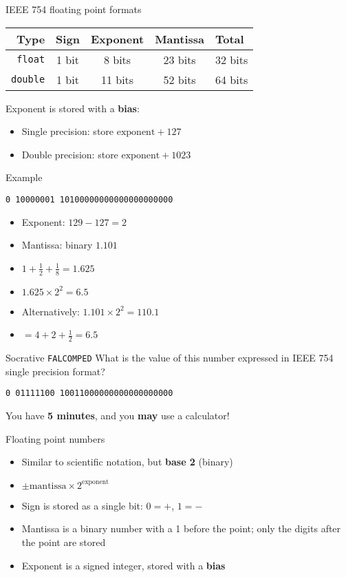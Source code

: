 \begin{frame}{IEEE 754 floating point formats}
	\begin{center}
		\begin{tabular}{|r|ccc|l|}
			\hline
			Type & Sign & Exponent & Mantissa & Total \\\hline
			\lstinline{float} & 1 bit & 8 bits & 23 bits & 32 bits \\\hline
			\lstinline{double} & 1 bit & 11 bits & 52 bits & 64 bits \\\hline
		\end{tabular}
	\end{center}
	\pause
	Exponent is stored with a \textbf{bias}:
	\begin{itemize}
		\item Single precision: store $\text{exponent} + 127$
		\item Double precision: store $\text{exponent} + 1023$
	\end{itemize}
\end{frame}

\begin{frame}{Example}
	\pause
	\begin{center}
		\texttt{0 10000001 10100000000000000000000}
	\end{center}
	\begin{itemize}
		\pause\item Exponent: $129 - 127 = 2$
		\pause\item Mantissa: binary $1.101$
		\pause\item $1 + \frac12 + \frac18 = 1.625$
		\pause\item $1.625 \times 2^2 = 6.5$
		\pause\item Alternatively: $1.101 \times 2^2 = 110.1$
		\pause\item $= 4 + 2 + \frac12 = 6.5$
	\end{itemize}
\end{frame}

\begin{frame}{Socrative \texttt{FALCOMPED}}
	\pause
	What is the value of this number expressed in IEEE 754 single precision format?
	\begin{center}
		\texttt{0 01111100 10011000000000000000000}
	\end{center}
	You have \textbf{5 minutes}, and you \textbf{may} use a calculator!
\end{frame}

\begin{frame}{Floating point numbers}
	\begin{itemize}
		\pause\item Similar to scientific notation, but \textbf{base 2} (binary)
		\pause\item $\pm \text{mantissa} \times 2^{\text{exponent}}$
		\pause\item Sign is stored as a single bit: $0=+$, $1=-$
		\pause\item Mantissa is a binary number with a 1 before the point;
			only the digits after the point are stored
		\pause\item Exponent is a signed integer, stored with a \textbf{bias}
	\end{itemize}
\end{frame}

